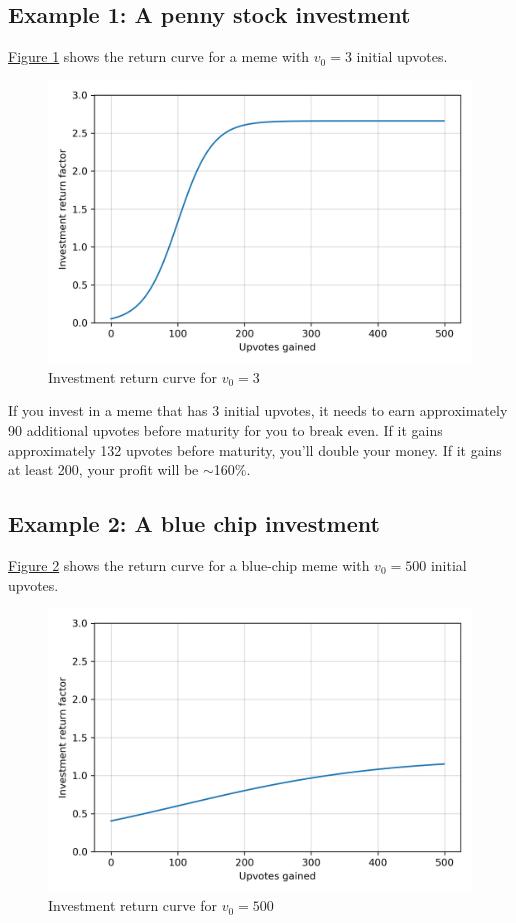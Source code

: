 \documentclass[a4paper, 12pt]{article}
\begin{document}
\subsection*{Example 1: A penny stock investment}
\label{sec:org8bac754}

\hyperref[fig:org0e1ede3]{Figure 1} shows the return curve for a meme with \(v_0 = 3\) initial upvotes.

\begin{figure}[H]
\centering
\includegraphics[width=.9\linewidth]{./paper_figure_1.png}
\caption{\label{fig:org0e1ede3}
Investment return curve for \(v_0 = 3\)}
\end{figure}

If you invest in a meme that has 3 initial upvotes, it needs to earn approximately 90
additional upvotes before maturity for you to break even. If it gains
approximately 132 upvotes before maturity, you'll double your money. If it gains
at least 200, your profit will be \(\sim\)160\%.

\subsection*{Example 2: A blue chip investment}
\label{sec:org128be1a}

\hyperref[fig:orgf0fe3c1]{Figure 2} shows the return curve for a blue-chip meme with \(v_0 = 500\)
initial upvotes.

\begin{figure}[H]
\centering
\includegraphics[width=.9\linewidth]{./paper_figure_2.png}
\caption{\label{fig:orgf0fe3c1}
Investment return curve for \(v_0 = 500\)}
\end{figure}
\end{document}
